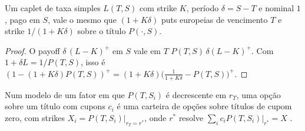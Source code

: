 \begin{proposicao}
Um caplet de taxa simples $L(T,S)$ com strike $K$, período $\delta=S-T$ e nominal $1$, pago em $S$, vale o mesmo que $(1+K\delta)$ puts europeias de vencimento $T$ e strike $1/(1+K\delta)$ sobre o título $P(\cdot,S)$.
\end{proposicao}

\begin{proof}
O payoff $\delta\,(L-K)^+$ em $S$ vale em $T$ $P(T,S)\,\delta(L-K)^+$. Com $1+\delta L=1/P(T,S)$, isso é $(1-(1+K\delta)P(T,S))^+=(1+K\delta)\big(\tfrac1{1+K\delta}-P(T,S)\big)^+$.
\end{proof}

\begin{teorema}[Jamshidian]
Num modelo de um fator em que $P(T,S_i)$ é decrescente em $r_T$, uma opção sobre um título com cupons $c_i$ é uma carteira de opções sobre títulos de cupom zero, com strikes $X_i=P(T,S_i)|_{r_T=r^*}$, onde $r^*$ resolve $\sum_ic_iP(T,S_i)|_{r^*}=X$ \citep{jamshidian1989}.
\end{teorema}
